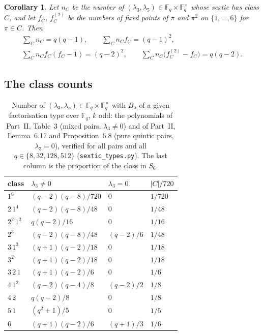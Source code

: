 \documentclass[12pt,a4paper]{amsart}
\newtheorem{corollary}[theorem]{Corollary}
\theoremstyle{definition}
\newcommand{\F}{\mathbb{F}}
\begin{document}
\begin{corollary}\label{cor:relations}
Let $n_C$ be the number of $(\lambda_3,\lambda_5)\in\F_q\times\F_q^\times$ whose sextic has class $C$, and let $f_C$, $f_C^{(2)}$ be the numbers of fixed points of $\pi$ and $\pi^2$ on $\{1,\dots,6\}$ for $\pi\in C$. Then
\begin{gather*}
\sum_Cn_C=q(q-1),\qquad \sum_Cn_Cf_C=(q-1)^2,\\
\sum_Cn_Cf_C(f_C-1)=(q-2)^2,\qquad \sum_Cn_C\bigl(f_C^{(2)}-f_C\bigr)=q(q-2).
\end{gather*}
\end{corollary}

\subsection{The class counts}
\begin{table}[H]
\centering
\caption{Number of $(\lambda_3,\lambda_5)\in\F_q\times\F_q^\times$ with $B_\lambda$ of a given factorisation type over $\F_q$, $k$ odd: the polynomials of Part~II, Table~3 (mixed pairs, $\lambda_3\ne0$) and of Part~II, Lemma~6.17 and Proposition~6.8 (pure quintic pairs, $\lambda_3=0$), verified for all pairs and all $q\in\{8,32,128,512\}$ (\texttt{sextic\_types.py}). The last column is the proportion of the class in $S_6$.}\label{tab:counts}
\small
\begin{tabular}{@{}llll@{}}
\toprule
class & $\lambda_3\ne0$ & $\lambda_3=0$ & $|C|/720$\\
\midrule
$1^6$ & $(q-2)(q-8)/720$ & $0$ & $1/720$\\
$2\,1^4$ & $(q-2)(q-8)/48$ & $0$ & $1/48$\\
$2^2\,1^2$ & $q(q-2)/16$ & $0$ & $1/16$\\
$2^3$ & $(q-2)(q-8)/48$ & $(q-2)/6$ & $1/48$\\
$3\,1^3$ & $(q+1)(q-2)/18$ & $0$ & $1/18$\\
$3^2$ & $(q+1)(q-2)/18$ & $0$ & $1/18$\\
$3\,2\,1$ & $(q+1)(q-2)/6$ & $0$ & $1/6$\\
$4\,1^2$ & $(q-2)(q-4)/8$ & $(q-2)/2$ & $1/8$\\
$4\,2$ & $q(q-2)/8$ & $0$ & $1/8$\\
$5\,1$ & $(q^2+1)/5$ & $0$ & $1/5$\\
$6$ & $(q+1)(q-2)/6$ & $(q+1)/3$ & $1/6$\\
\bottomrule
\end{tabular}
\end{table}
\end{document}
